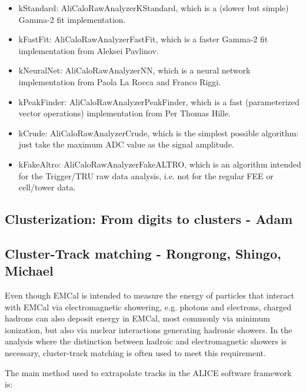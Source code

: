 \begin{itemize}
 \item kStandard:
   AliCaloRawAnalyzerKStandard, which is a (slower but simple) Gamma-2 fit implementation.
 \item  kFastFit: 
   AliCaloRawAnalyzerFastFit, which is a faster Gamma-2 fit implementation from Aleksei Pavlinov.
 \item kNeuralNet:
   AliCaloRawAnalyzerNN, which is a neural network implementation from Paola La Rocca and Franco Riggi.
 \item kPeakFinder:
   AliCaloRawAnalyzerPeakFinder, which is a fast (parameterized vector operations) implementation from Per Thomas Hille. 
 \item kCrude:
   AliCaloRawAnalyzerCrude, which is the simplest possible algorithm: just take the maximum ADC value as the signal amplitude.
 \item kFakeAltro:
   AliCaloRawAnalyzerFakeALTRO, which is an algorithm intended for the Trigger/TRU raw data analysis, i.e. not for the regular FEE or cell/tower data.
\end{itemize}



\subsection{Clusterization: From digits to clusters - Adam}





\subsection{Cluster-Track matching - Rongrong, Shingo, Michael}

Even though EMCal is intended to measure the energy of particles that interact with EMCal via electromagnetic showering, e.g. photons and electrons, charged hadrons can also deposit energy in EMCal, most commonly via minimum ionization, but also via nuclear interactions generating hadronic showers. In the analysis where the distinction between hadroic and electromagnetic showers is necessary, cluster-track matching is often used to meet this requirement. 

The main method used to extrapolate tracks in the ALICE software framework is:

